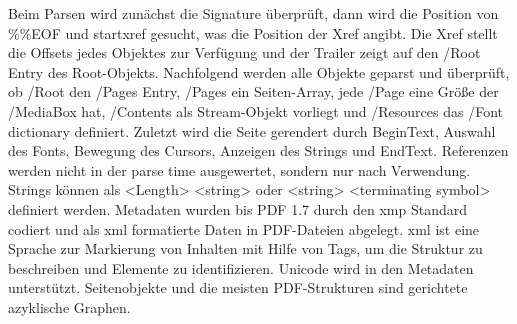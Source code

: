 Beim Parsen wird zunächst die Signature überprüft, dann wird die Position von \%\%EOF und startxref gesucht, was die Position der Xref angibt. Die Xref stellt die Offsets jedes Objektes zur Verfügung und der Trailer zeigt auf den /Root Entry des Root-Objekts. Nachfolgend werden alle Objekte geparst und überprüft, ob /Root den /Pages Entry, /Pages ein Seiten-Array, jede /Page eine Größe der /MediaBox hat, /Contents als Stream-Objekt vorliegt und /Resources das /Font dictionary definiert. Zuletzt wird die Seite gerendert durch BeginText, Auswahl des Fonts, Bewegung des Cursors, Anzeigen des Strings und EndText. \cite{ccc-pdf-secrets} Referenzen werden nicht in der parse time ausgewertet, sondern nur nach Verwendung. Strings können als <Length> <string> oder <string> <terminating symbol> definiert werden. \cite{ccc-wtf-pdf}
Metadaten wurden bis PDF 1.7 durch den \gls{xmp} Standard codiert und als \gls{xml} formatierte Daten in PDF-Dateien abgelegt.
\cite{softx} 
\gls{xml} ist eine Sprache zur Markierung von Inhalten mit Hilfe von Tags, um die Struktur zu beschreiben und Elemente zu identifizieren.
\cite{schneeberger}
Unicode wird in den Metadaten unterstützt. 
Seitenobjekte und die meisten PDF-Strukturen sind gerichtete azyklische Graphen. \cite{ccc-wtf-pdf}


